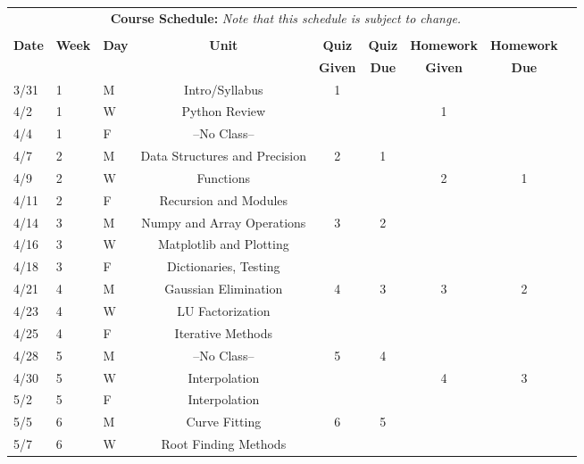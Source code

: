 \documentclass[11pt, a4paper]{article}
\begin{document}
\pagebreak
\FloatBarrier
\renewcommand{\arraystretch}{1}
\begin{table}[h]
\begin{center}
\begin{tabular}{lllcccccc}
\multicolumn{8}{c}{\textbf{Course Schedule:}\textit{ Note that this schedule is
subject to change.}}\\
&&&&&&&&\\
\textbf{Date} & \textbf{Week} & \textbf{Day} & \textbf{Unit} & \textbf{Quiz} & \textbf{Quiz}& \textbf{Homework} & \textbf{Homework}\\
              &  &  &  & \textbf{Given}  & \textbf{Due\footnotemark[1]}  & \textbf{Given} & \textbf{Due\footnotemark[2]}\\ \hline
\hline
3/31 & 1 & M & Intro/Syllabus                     & 1 &   &   &  \\
4/2  & 1 & W & Python Review                      &   &   & 1 &  \\
4/4  & 1 & F & --No Class--                       &   &   &   &  \\
4/7  & 2 & M & Data Structures and Precision      & 2 & 1 &   &  \\
4/9  & 2 & W & Functions                          &   &   & 2 & 1 \\
4/11 & 2 & F & Recursion and Modules              &   &   &   &  \\
4/14 & 3 & M & Numpy and Array Operations         & 3 & 2 &   &  \\
4/16 & 3 & W & Matplotlib and Plotting            &   &   &   &  \\
4/18 & 3 & F & Dictionaries, Testing              &   &   &   &  \\
4/21 & 4 & M & Gaussian Elimination               & 4 & 3 & 3 & 2\\
4/23 & 4 & W & LU Factorization                   &   &   &   &  \\
4/25 & 4 & F & Iterative Methods                  &   &   &   &  \\
4/28 & 5 & M & --No Class--                       & 5 & 4 &   &  \\
4/30 & 5 & W & Interpolation                      &   &   & 4 & 3\\
5/2  & 5 & F & Interpolation                      &   &   &   &  \\
5/5  & 6 & M & Curve Fitting                      & 6 & 5 &   &  \\
5/7  & 6 & W &        Root Finding Methods        &   &   &   &  \\

\end{tabular}
\end{center}
\end{table}
\end{document}
